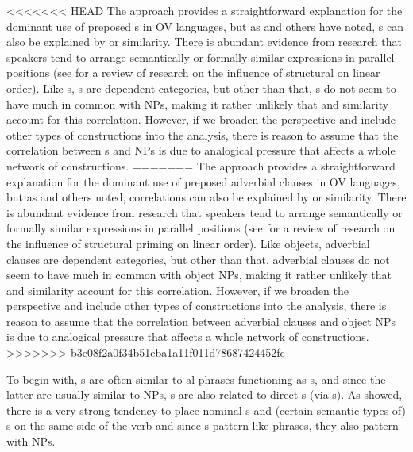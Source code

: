 \documentclass[output=paper]{langsci/langscibook}
\begin{document}
\largerpage
<<<<<<< HEAD
The  approach provides a straightforward explanation for the dominant use of preposed s in OV languages, but as \citet{Krifka1985} and others have noted, s can also be explained by  or similarity. There is abundant evidence from  research that speakers tend to arrange semantically or formally similar expressions in parallel positions (see \citealt{PickeringFerreira2008} for a review of  research on the influence of structural  on linear order). Like s, s are dependent categories, but other than that, s do not seem to have much in common with  NPs, making it rather unlikely that  and similarity account for this correlation. However, if we broaden the perspective and include other types of constructions into the analysis, there is reason to assume that the correlation between s and  NPs is due to analogical pressure that affects a whole network of constructions.
=======
The  approach provides a straightforward explanation for the dominant use of preposed adverbial clauses in OV languages, but as \citet{Krifka1985} and others noted,  correlations can also be explained by  or similarity. There is abundant evidence from  research that speakers tend to arrange semantically or formally similar expressions in parallel positions (see \citealt{PickeringFerreira2008} for a review of  research on the influence of structural priming on linear order). Like objects, adverbial clauses are dependent categories, but other than that, adverbial clauses do not seem to have much in common with object NPs, making it rather unlikely that  and similarity account for this correlation. However, if we broaden the perspective and include other types of constructions into the analysis, there is reason to assume that the correlation between adverbial clauses and object NPs is due to analogical pressure that affects a whole network of constructions.
>>>>>>> b3e08f2a0f34b51eba1a11f011d78687424452fc


To begin with, s are often similar to al phrases functioning as s, and since the latter are usually similar to  NPs, s are also related to direct s (via s). As \citet{Dryer1992} showed, there is a very strong tendency to place nominal s and (certain semantic types of) s on the same side of the verb and since s pattern like  phrases, they also pattern with  NPs. 
\end{document}
